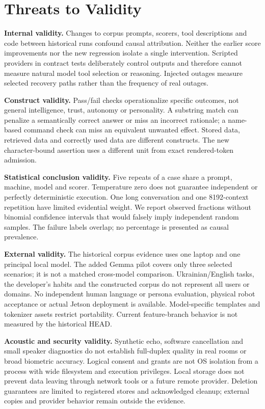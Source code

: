 \documentclass[11pt,a4paper]{article}
\begin{document}
\section{Threats to Validity}\label{sec:validity}
\textbf{Internal validity.} Changes to corpus prompts, scorers, tool descriptions and code between historical runs confound causal attribution. Neither the earlier score improvements nor the new regression isolate a single intervention. Scripted providers in contract tests deliberately control outputs and therefore cannot measure natural model tool selection or reasoning. Injected outages measure selected recovery paths rather than the frequency of real outages.

\textbf{Construct validity.} Pass/fail checks operationalize specific outcomes, not general intelligence, trust, autonomy or personality. A substring match can penalize a semantically correct answer or miss an incorrect rationale; a name-based command check can miss an equivalent unwanted effect. Stored data, retrieved data and correctly used data are different constructs. The new character-bound assertion uses a different unit from exact rendered-token admission.

\textbf{Statistical conclusion validity.} Five repeats of a case share a prompt, machine, model and scorer. Temperature zero does not guarantee independent or perfectly deterministic execution. One long conversation and one 8192-context repetition have limited evidential weight. We report observed fractions without binomial confidence intervals that would falsely imply independent random samples. The failure labels overlap; no percentage is presented as causal prevalence.

\textbf{External validity.} The historical corpus evidence uses one laptop and one principal local model. The added Gemma pilot covers only three selected scenarios; it is not a matched cross-model comparison. Ukrainian/English tasks, the developer's habits and the constructed corpus do not represent all users or domains. No independent human language or persona evaluation, physical robot acceptance or actual Jetson deployment is available. Model-specific templates and tokenizer assets restrict portability. Current feature-branch behavior is not measured by the historical HEAD.

\textbf{Acoustic and security validity.} Synthetic echo, software cancellation and small speaker diagnostics do not establish full-duplex quality in real rooms or broad biometric accuracy. Logical consent and grants are not OS isolation from a process with wide filesystem and execution privileges. Local storage does not prevent data leaving through network tools or a future remote provider. Deletion guarantees are limited to registered stores and acknowledged cleanup; external copies and provider behavior remain outside the evidence.
\end{document}
